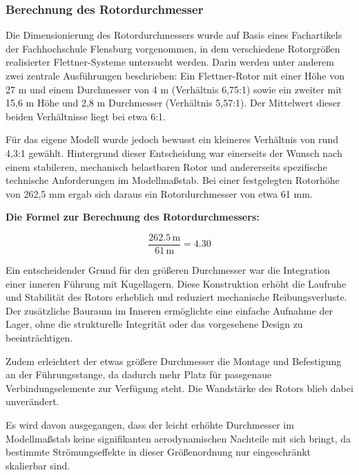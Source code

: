 \documentclass[a4paper,12pt]{article}
\begin{document}
\newpage

\subsubsection{Berechnung des Rotordurchmesser}
\label{sec:Berechnung des Rotorsdurchmesser}
Die Dimensionierung des Rotordurchmessers wurde auf Basis eines Fachartikels der Fachhochschule Flensburg vorgenommen, in dem verschiedene Rotorgrößen realisierter Flettner-Systeme untersucht werden. Darin werden unter anderem zwei zentrale Ausführungen beschrieben: Ein Flettner-Rotor mit einer Höhe von 27 m und einem Durchmesser von 4 m (Verhältnis 6,75:1) sowie ein zweiter mit 15,6 m Höhe und 2,8 m Durchmesser (Verhältnis 5,57:1). Der Mittelwert dieser beiden Verhältnisse liegt bei etwa 6:1.\cite{Fachhochschule_Flensburg}\newline

Für das eigene Modell wurde jedoch bewusst ein kleineres Verhältnis von rund 4,3:1 gewählt. Hintergrund dieser Entscheidung war einerseits der Wunsch nach einem stabileren, mechanisch belastbaren Rotor und andererseits spezifische technische Anforderungen im Modellmaßstab. Bei einer festgelegten Rotorhöhe von 262,5 mm ergab sich daraus ein Rotordurchmesser von etwa 61 mm.\newline


\textbf{Die Formel zur Berechnung des Rotordurchmessers:}

\[
\frac{262.5 \, \text{m}}{61 \, \text{m}} = 4.30
\]\newline

Ein entscheidender Grund für den größeren Durchmesser war die Integration einer inneren Führung mit Kugellagern. Diese Konstruktion erhöht die Laufruhe und Stabilität des Rotors erheblich und reduziert mechanische Reibungsverluste. Der zusätzliche Bauraum im Inneren ermöglichte eine einfache Aufnahme der Lager, ohne die strukturelle Integrität oder das vorgesehene Design zu beeinträchtigen.

Zudem erleichtert der etwas größere Durchmesser die Montage und Befestigung an der Führungsstange, da dadurch mehr Platz für passgenaue Verbindungselemente zur Verfügung steht. Die Wandstärke des Rotors blieb dabei unverändert.\newline

Es wird davon ausgegangen, dass der leicht erhöhte Durchmesser im Modellmaßstab keine signifikanten aerodynamischen Nachteile mit sich bringt, da bestimmte Strömungseffekte in dieser Größenordnung nur eingeschränkt skalierbar sind.
\end{document}
